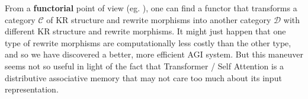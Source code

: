 \documentclass[runningheads]{llncs}
\begin{document}
%


From a \textbf{functorial} point of view (eg.\cite{Crescenzi2024} \cite{Abbott2024} \cite{Khatri2024}), one can find a functor that transforms a category $\mathcal{C}$ of KR structure and rewrite morphisms into another category $\mathcal{D}$ with different KR structure and rewrite morphisms.  It might just happen that one type of rewrite morphisms are computationally less costly than the other type, and so we have discovered a better, more efficient AGI system.  But this maneuver seems not so useful in light of the fact that Transformer / Self Attention is a distributive associative memory that may not care too much about its input representation.


\end{document}

